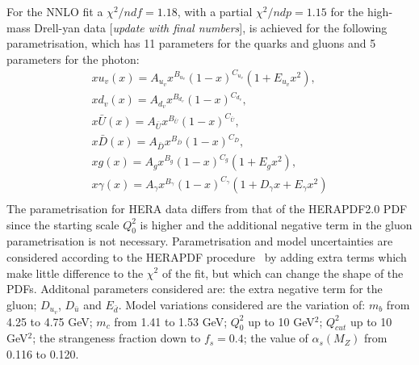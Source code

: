  For the NNLO fit a $\chi^{2}/ndf = 1.18$, with a partial $\chi^2/ndp = 1.15$ for the high-mass Drell-yan data [{\it update with final numbers}], is achieved for the following parametrisation, which has 11 parameters for the quarks and gluons and 5 parameters for the photon:
\begin{eqnarray}
xu_v(x) = A_{u_v}x^{B_{u_v}}(1-x)^{C_{u_v}}(1+E_{u_v}x^{2}), \\
xd_v(x) = A_{d_v}x^{B_{d_v}}(1-x)^{C_{d_v}}, \\
x\bar{U}(x) = A_{\bar{U}}x^{B_{\bar{U}}}(1-x)^{C_{\bar{U}}}, \\
x\bar{D}(x) = A_{\bar{D}}x^{B_{\bar{D}}}(1-x)^{C_{\bar{D}}}, \\
xg(x) = A_{g}x^{B_{g}}(1-x)^{C_{g}}(1+E_{g}x^{2}), \\
x\gamma(x) = A_{\gamma}x^{B_{\gamma}}(1-x)^{C_{\gamma}}(1+D_{\gamma}x+E_{\gamma}x^{2}) \\
\end{eqnarray}
The parametrisation for HERA data differs from that of the HERAPDF2.0 PDF since the starting scale $Q^2_0$ is higher and the additional negative term in the gluon parametrisation is not necessary.
Parametrisation and model uncertainties are considered according to the HERAPDF 
procedure~\cite{hera} 
by adding extra terms which make little difference to the $\chi^2$ of the fit, but which can change the shape of the PDFs. Additonal parameters considered are: the extra negative term for the gluon; $D_{u_v}$, $D_{\bar{u}}$ and $E_{\bar{d}}$. Model variations considered are the variation of: 
$m_b$ from 4.25 to 4.75 GeV; $m_c$ from 1.41 to 1.53 GeV;  $Q_0^2$ up to 10 GeV$^2$; 
$Q_{cut}^2$ up to 10 GeV$^2$; the strangeness fraction down to $f_s=0.4$; the value of $\alpha_s(M_Z)$ from 0.116 to 0.120.
